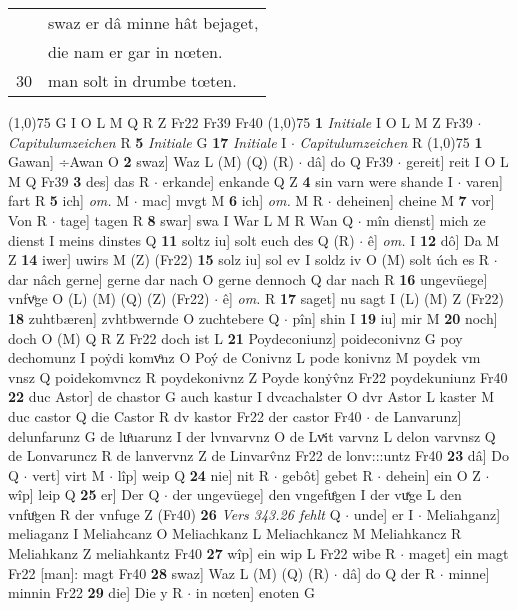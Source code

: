 \documentclass[8pt,a4paper,notitlepage]{article}
\begin{document}
\begin{table}[ht]
\begin{minipage}[t]{0.5\linewidth}
\begin{tabular}{rl}
 & swaz er dâ minne hât bejaget,\\ 
 & die nam er gar in nœten.\\ 
30 & man solt in drumbe tœten.\\ 
\end{tabular}
\scriptsize
\line(1,0){75} \newline
G I O L M Q R Z Fr22 Fr39 Fr40 \newline
\line(1,0){75} \newline
\textbf{1} \textit{Initiale} I O L M Z Fr39   $\cdot$ \textit{Capitulumzeichen} R  \textbf{5} \textit{Initiale} G  \textbf{17} \textit{Initiale} I   $\cdot$ \textit{Capitulumzeichen} R  \newline
\line(1,0){75} \newline
\textbf{1} Gawan] ÷Awan O \textbf{2} swaz] Waz L (M) (Q) (R)  $\cdot$ dâ] do Q Fr39  $\cdot$ gereit] reit I O L M Q Fr39 \textbf{3} des] das R  $\cdot$ erkande] enkande Q Z \textbf{4} sin varn were shande I  $\cdot$ varen] fart R \textbf{5} ich] \textit{om.} M  $\cdot$ mac] mvgt M \textbf{6} ich] \textit{om.} M R  $\cdot$ deheinen] cheine M \textbf{7} vor] Von R  $\cdot$ tage] tagen R \textbf{8} swar] swa I War L M R Wan Q  $\cdot$ mîn dienst] mich ze dienst I meins dinstes Q \textbf{11} soltz iu] solt euch des Q (R)  $\cdot$ ê] \textit{om.} I \textbf{12} dô] Da M Z \textbf{14} iwer] uwirs M (Z) (Fr22) \textbf{15} solz iu] sol ev I soldz iv O (M) solt úch es R  $\cdot$ dar nâch gerne] gerne dar nach O gerne dennoch Q dar nach R \textbf{16} ungevüege] vnfvͦge O (L) (M) (Q) (Z) (Fr22)  $\cdot$ ê] \textit{om.} R \textbf{17} saget] nu sagt I (L) (M) Z (Fr22) \textbf{18} zuhtbæren] zvhtbwernde O zuchtebere Q  $\cdot$ pîn] shin I \textbf{19} iu] mir M \textbf{20} noch] doch O (M) Q R Z Fr22 doch ist L \textbf{21} Poydeconiunz] poideconivnz G poy dechomunz I poẏdi komvͦnz O Poý de Conivnz L pode konivnz M poydek vm vnsz Q poidekomvncz R poydekonivnz Z Poyde konẏv̂nz Fr22 poydekuniunz Fr40 \textbf{22} duc Astor] de chastor G auch kastur I dvcachalster O dvr Astor L kaster M duc castor Q die Castor R dv kastor Fr22 der castor Fr40  $\cdot$ de Lanvarunz] delunfarunz G de luͦuarunz I der lvnvarvnz O de Lvͯit varvnz L delon varvnsz Q de Lonvaruncz R de lanvervnz Z de Linvarv̂nz Fr22 de lonv:::untz Fr40 \textbf{23} dâ] Do Q  $\cdot$ vert] virt M  $\cdot$ lîp] weip Q \textbf{24} nie] nit R  $\cdot$ gebôt] gebet R  $\cdot$ dehein] ein O Z  $\cdot$ wîp] leip Q \textbf{25} er] Der Q  $\cdot$ der ungevüege] den vngefuͤgen I der vuͯge L den vnfuͦgen R der vnfuge Z (Fr40) \textbf{26} \textit{Vers 343.26 fehlt} Q   $\cdot$ unde] er I  $\cdot$ Meliahganz] meliaganz I Meliahcanz O Meliachkanz L Meliachkancz M Meliahkancz R Meliahkanz Z meliahkantz Fr40 \textbf{27} wîp] ein wip L Fr22 wibe R  $\cdot$ maget] ein magt Fr22 [man]: magt Fr40 \textbf{28} swaz] Waz L (M) (Q) (R)  $\cdot$ dâ] do Q der R  $\cdot$ minne] minnin Fr22 \textbf{29} die] Die y R  $\cdot$ in nœten] enoten G \newline

\end{minipage}
\end{table}
\end{document}
